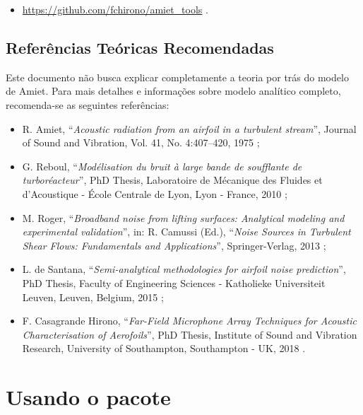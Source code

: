 \documentclass[a4paper, 11pt, twoside]{article}
\begin{document}
\begin{itemize}
	\item \url{https://github.com/fchirono/amiet_tools} .
\end{itemize}


\subsection{Referências Teóricas Recomendadas}

Este documento não busca explicar completamente a teoria por trás do modelo de Amiet. Para mais detalhes e informações sobre modelo analítico completo, recomenda-se as seguintes referências:

\begin{itemize}
	\item R. Amiet, ``\emph{Acoustic radiation from an airfoil in a turbulent stream}'', Journal of Sound and Vibration, Vol. 41, No. 4:407–420, 1975 \cite{Amiet75};
	
	\item G. Reboul, ``\emph{Modélisation du bruit à large bande de soufflante de turboréacteur}'', PhD Thesis, Laboratoire de Mécanique des Fluides et d’Acoustique - École Centrale de Lyon, Lyon - France, 2010 \cite{Reboul10};
	
	\item M. Roger, ``\emph{Broadband noise from lifting surfaces: Analytical modeling and experimental validation}'', in: R. Camussi (Ed.), ``\emph{Noise Sources in Turbulent Shear Flows: Fundamentals and Applications}'', Springer-Verlag, 2013 \cite{Roger13};
	
	\item L. de Santana, ``\emph{Semi-analytical methodologies for airfoil noise prediction}'', PhD Thesis, Faculty of Engineering Sciences - Katholieke Universiteit Leuven, Leuven, Belgium, 2015 \cite{deSantana2015};
	
	\item F. Casagrande Hirono, ``\emph{Far-Field Microphone Array Techniques for Acoustic Characterisation of Aerofoils}'', PhD Thesis, Institute of Sound and Vibration Research, University of Southampton, Southampton - UK, 2018 \cite{Casagrande18}.
\end{itemize}


\clearpage
\newpage
\section{Usando o pacote}
\end{document}
